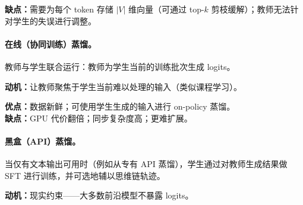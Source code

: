 \textbf{缺点：}需要为每个 token 存储 $|V|$ 维向量（可通过 top-$k$ 剪枝缓解）；教师无法针对学生的失误进行调整。

\paragraph{在线（协同训练）蒸馏。}
\label{online-co-training-distillation.}

教师与学生联合运行：教师为学生当前的训练批次生成 logits。

\textbf{动机：}让教师聚焦于学生当前难以处理的输入（类似课程学习）。

\textbf{优点：}数据新鲜；可使用学生生成的输入进行 on-policy 蒸馏。\\

\textbf{缺点：}GPU 代价翻倍；同步复杂度高；更难扩展。

\paragraph{黑盒（API）蒸馏。}
\label{black-box-api-distillation.}

当仅有文本输出可用时（例如从专有 API 蒸馏），学生通过对教师生成结果做 SFT 进行训练，并可选地辅以思维链轨迹。

\textbf{动机：}现实约束——大多数前沿模型不暴露 logits。

